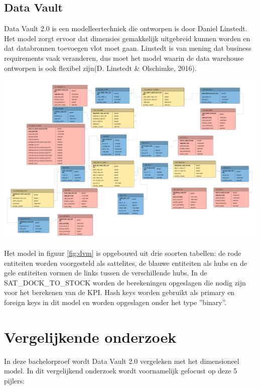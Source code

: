 \documentclass[a0,portrait]{a0poster}
\begin{document}
\begin{multicols}{2}
\color{HoGentAccent1} 
\subsection*{Data Vault}
\color{black}
Data Vault 2.0 is een modelleertechniek die ontworpen is door Daniel Linstedt. Het model zorgt ervoor dat dimensies gemakkelijk uitgebreid kunnen worden en dat databronnen toevoegen vlot moet gaan. Linstedt is van mening dat business requirements vaak veranderen, dus moet het model waarin de data warehouse ontworpen is ook flexibel zijn(D. Linstedt \& Olschimke, 2016).
\begin{center}\vspace{1cm}
\includegraphics[width=1.0\linewidth]{DataVaultModel.png}
\label{fig:dvm}
\end{center}\vspace{1cm}
Het model in figuur \ref{fig:dvm} is opgebouwd uit drie soorten tabellen: de rode entiteiten worden voorgesteld als sattelites, de blauwe entiteiten als hubs en de gele entiteiten vormen de links tussen de verschillende hubs. In de SAT\_DOCK\_TO\_STOCK worden de berekeningen opgeslagen die nodig zijn voor het berekenen van de KPI. Hash keys worden gebruikt als primary en foreign keys in dit model en worden opgeslagen onder het type ''binary''.

\color{HoGentAccent1} 
\section*{Vergelijkende onderzoek}
\color{black}
In deze bachelorproef wordt Data Vault 2.0 vergeleken met het dimensioneel model. In dit vergelijkend onderzoek wordt voornamelijk gefocust op deze 5 pijlers:


\end{multicols}
\end{document}
